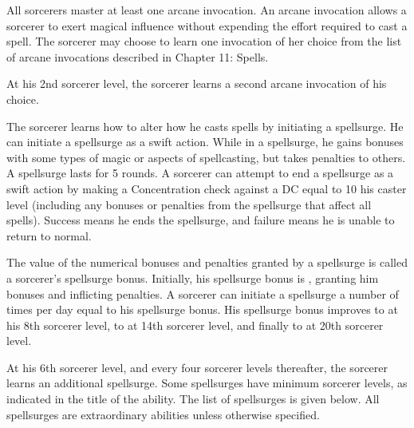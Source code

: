  All sorcerers master at least one arcane invocation. An arcane invocation allows a sorcerer to exert magical influence without expending the effort required to cast a spell. The sorcerer may choose to learn one invocation of her choice from the list of arcane invocations described in Chapter 11: Spells.

At his 2nd sorcerer level, the sorcerer learns a second arcane invocation of his choice.

 The sorcerer learns how to alter how he casts spells by initiating a spellsurge. He can initiate a spellsurge as a swift action. While in a spellsurge, he gains bonuses with some types of magic or aspects of spellcasting, but takes penalties to others. A spellsurge lasts for 5 rounds. A sorcerer can attempt to end a spellsurge as a swift action by making a Concentration check against a DC equal to 10 \add his caster level (including any bonuses or penalties from the spellsurge that affect all spells). Success means he ends the spellsurge, and failure means he is unable to return to normal.

The value of the numerical bonuses and penalties granted by a spellsurge is called a sorcerer's spellsurge bonus. Initially, his spellsurge bonus is , granting him  bonuses and inflicting  penalties. A sorcerer can initiate a spellsurge a number of times per day equal to his spellsurge bonus. His spellsurge bonus improves to  at his 8th sorcerer level, to  at 14th sorcerer level, and finally to  at 20th sorcerer level.

At his 6th sorcerer level, and every four sorcerer levels thereafter, the sorcerer learns an additional spellsurge. Some spellsurges have minimum sorcerer levels, as indicated in the title of the ability. The list of spellsurges is given below. All spellsurges are extraordinary abilities unless otherwise specified.

